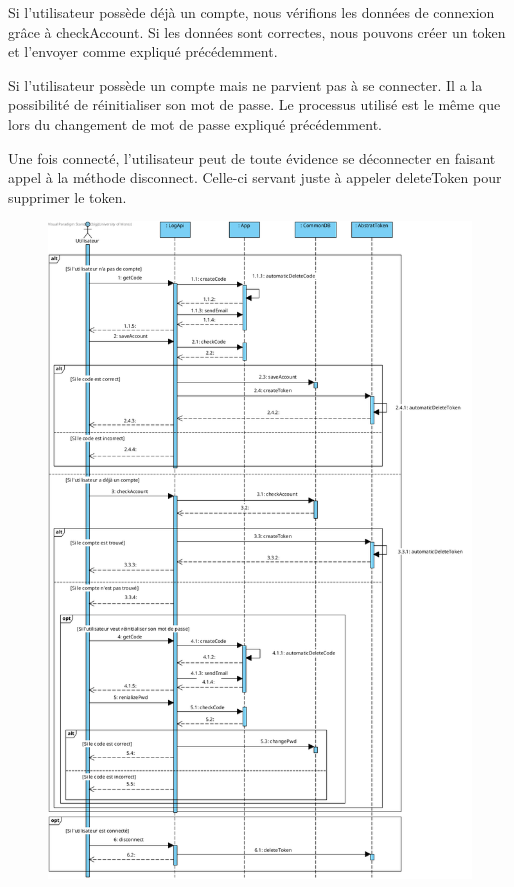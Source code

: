 \begin{flushleft}
Si l'utilisateur possède déjà un compte, nous vérifions les données de connexion grâce à checkAccount. Si les données sont correctes, nous pouvons créer un token et l'envoyer comme expliqué précédemment.
\end{flushleft}

\begin{flushleft}
Si l'utilisateur possède un compte mais ne parvient pas à se connecter. Il a la possibilité de réinitialiser son mot de passe. Le processus utilisé est le même que lors du changement de mot de passe expliqué précédemment.
\end{flushleft}

\begin{flushleft}
Une fois connecté, l'utilisateur peut de toute évidence se déconnecter en faisant appel à la méthode disconnect. Celle-ci servant juste à appeler deleteToken pour supprimer le token.
\end{flushleft}

\newpage
\begin{figure}[h]
\centering
\includegraphics[width = 1\textwidth]{Base/sequence/img/common/S'authentifier.png}
\end{figure}

